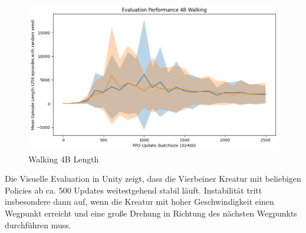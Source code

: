 \begin{figure}[ht]
    \centering
    \includegraphics[width=0.5\linewidth]{resources/img/results/Walking4B_Length.png}
    \caption{Walking 4B Length}\label{fig:Walking4B_Length}
\end{figure}

Die Visuelle Evaluation in Unity zeigt, dass die Vierbeiner Kreatur mit beliebigen Policies ab ca. 500 Updates weitestgehend stabil läuft. Instabilität tritt insbesondere dann auf, wenn die Kreatur mit hoher Geschwindigkeit einen Wegpunkt erreicht und eine große Drehung in Richtung des nächsten Wegpunkts durchführen muss. 

